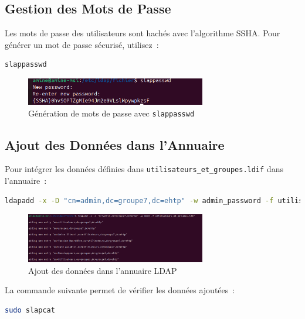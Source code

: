 \subsection*{Gestion des Mots de Passe}
Les mots de passe des utilisateurs sont hachés avec l’algorithme SSHA. Pour générer un mot de passe sécurisé, utilisez :
\begin{lstlisting}[language=bash]
slappasswd
\end{lstlisting}

\begin{figure}[h]
	\centering
	\includegraphics[width=0.7\textwidth]{LDAP/slap.png}
	\caption{Génération de mots de passe avec \texttt{slappasswd}}
	\label{fig:slap}
\end{figure}

\subsection*{Ajout des Données dans l'Annuaire}
Pour intégrer les données définies dans \texttt{utilisateurs\_et\_groupes.ldif} dans l'annuaire :
\begin{lstlisting}[language=bash]
ldapadd -x -D "cn=admin,dc=groupe7,dc=ehtp" -w admin_password -f utilisateurs_et_groupes.ldif
\end{lstlisting}

\begin{figure}[h]
	\centering
	\includegraphics[width=0.7\textwidth]{LDAP/add.png}
	\caption{Ajout des données dans l'annuaire LDAP}
	\label{fig:add}
\end{figure}

La commande suivante permet de vérifier les données ajoutées :
\begin{lstlisting}[language=bash]
sudo slapcat
\end{lstlisting}

